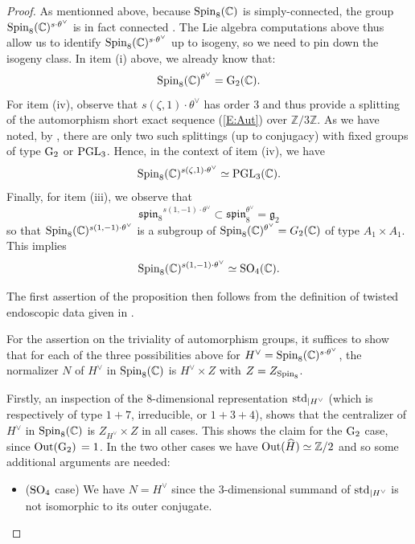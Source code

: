 \documentclass[11pt]{amsart}
\theoremstyle{plain}
\numberwithin{equation}{section}
\newcommand{\Z}{\mathbb Z}
\newcommand{\C}{\mathbb C}
\def\Spin{{\rm Spin}}
\def\Spin{{\rm Spin}}
\def\PGL{{\rm PGL}}
\def\SO{{\rm SO}}
\def\Z{{\mathbb Z}}
\def\C{{\bf C}}
\def\C{{\mathbb C}}
\begin{document}
 \vskip 5pt
 \begin{proof}
As mentionned above, because $\Spin_8(\C)$ is simply-connected, the group $\Spin_8(\C)^{ s \cdot \theta^{\vee}}$ is in fact connected \cite[Chap. 1, \S 1.1, Pg. 14]{KSh}.
  The Lie algebra computations above thus allow us to identify $\Spin_8(\C)^{ s \cdot \theta^{\vee}}$ up to isogeny, so we need to pin down the isogeny class. 
 In item (i) above, we already know that:
 \[  \Spin_8(\C)^{ \theta^{\vee}}  = {\rm G}_2(\C). \]
 For item (iv), observe that $s(\zeta, 1) \cdot \theta^{\vee}$ has order $3$ and thus provide a splitting of the automorphism short exact sequence (\ref{E:Aut}) over $\Z/3\Z$. As we have noted,  by \cite[Cor. 35.10 and Prop. 36.14]{KMRT}, there are only two such splittings (up to conjugacy) with fixed groups of type ${\rm G}_2$ or $\PGL_3$. Hence, in the context of item (iv), we have
 \[  \Spin_8(\C)^{ s(\zeta, 1) \cdot \theta^{\vee}}    \simeq \PGL_3 (\C).\]
 Finally, for item (iii), we observe that 
 \[  
 \mathfrak{spin_8}^{s(1,-1) \cdot \theta^{\vee}}  \subset \mathfrak{spin}_8^{\theta^{\vee}} = \mathfrak{g}_2 \]
 so that  $\Spin_8(\C)^{ s(1,-1) \cdot \theta^{\vee}}$ is a subgroup of  $\Spin_8(\C)^{ \theta^{\vee}}= G_2(\C)$ of type $A_1 \times A_1$. This implies 
 \[ \Spin_8(\C)^{ s(1,-1) \cdot \theta^{\vee}} \simeq \SO_4(\C). \]
 
The  first assertion of the proposition then follows from the definition of twisted endoscopic data given in \cite[Chap. 2]{KSh}.
\vskip 5pt

For the assertion on the triviality of automorphism groups, it suffices to show that for each of the 
three possibilities above for $H^\vee=\Spin_8(\C)^{ s \cdot \theta^{\vee}}$, the normalizer $N$ of $H^\vee$ in $\Spin_8(\C)$ is $H^\vee \times Z$ with $Z=Z_{\Spin_8}$.

\vskip 5pt

Firstly, an inspection of the $8$-dimensional representation ${\rm std}_{|H^\vee}$ (which is respectively of type $1+7$, irreducible, or $1+3+4$), shows  that the centralizer of $H^\vee$ in $\Spin_8(\C)$ is $Z_{H^\vee} \times Z$ in all cases. This shows the claim for  the ${\rm G}_2$ case, since  ${\rm Out} ({\rm G}_2)\,=1$. In the two other cases we have ${\rm Out}(\widehat{H}) \simeq  \Z/2$ and so some additional arguments are needed:

\begin{itemize}
\item[-]  (${\rm SO}_4$ case) We have $N=H^\vee$ since the $3$-dimensional summand of ${\rm std}_{|H^\vee}$ is not isomorphic to its outer conjugate.
\vskip 5pt


\end{itemize}
\end{proof}
\end{document}

